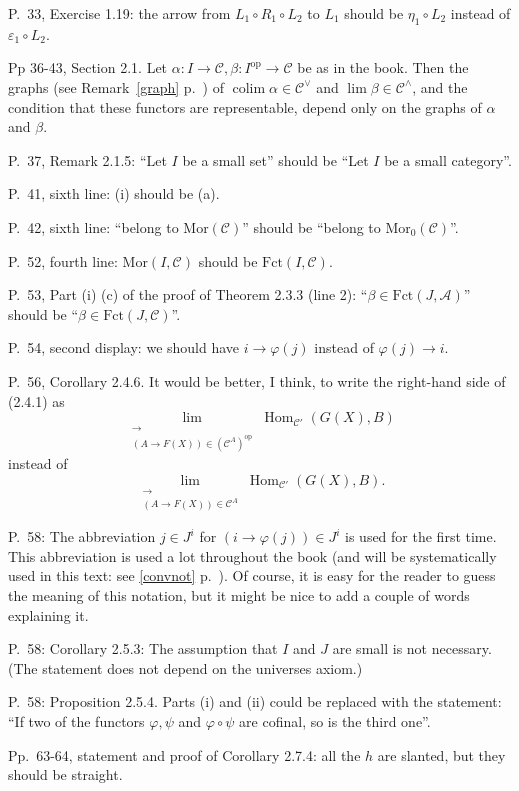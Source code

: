 \documentclass[12pt]{article}
\theoremstyle{remark}%
\newcommand{\n}{\noindent}
\newcommand{\A}{\mathcal A}
\newcommand{\C}{\mathcal C}
\DeclareMathOperator*{\coli}{colim}
\DeclareMathOperator{\h}{Hom}
\DeclareMathOperator{\op}{op}
\begin{document}
\n P.~33, Exercise 1.19: the arrow from $L_1\circ R_1\circ L_2$ to $L_1$ should be $\eta_1\circ L_2$ instead of $\varepsilon_1\circ L_2$. 

\n Pp 36-43, Section 2.1. Let $\alpha:I\to\C,\beta:I^{\op}\to\C$ be as in the book. Then the graphs (see Remark~\ref{graph} p.~\pageref{graph}) of $\coli\alpha\in\C^\vee$ and $\lim\beta\in\C^\wedge$, and the condition that these functors are representable, depend only on the graphs of $\alpha$ and $\beta$. 

\n P.~37, Remark 2.1.5: ``Let $I$ be a small set'' should be ``Let $I$ be a small category''.  

\n P.~41, sixth line: (i) should be (a). 

\n P.~42, sixth line: ``belong to $\text{Mor}(\C)$'' should be ``belong to $\text{Mor}_0(\C)$''.

\n P.~52, fourth line: $\text{Mor}(I,\C)$ should be $\text{Fct}(I,\C)$. 

\n P.~53, Part (i) (c) of the proof of Theorem 2.3.3 (line 2): ``$\beta\in\text{Fct}(J,\A)$'' should be ``$\beta\in\text{Fct}(J,\C)$''.

\n P.~54, second display: we should have $i\to\varphi(j)$ instead of $\varphi(j)\to i$. 

\n P.~56, Corollary 2.4.6. It would be better, I think, to write the right-hand side of (2.4.1) as 
$$
\lim_{\substack{\longrightarrow\\ (A\to F(X))\in(\C^A)^{\op}}}\h_{\C'}(G(X),B)
$$ 
instead of 
$$ 
\lim_{\substack{\longrightarrow\\ (A\to F(X))\in\C^A}}\h_{\C'}(G(X),B). 
$$

\n P.~58: The abbreviation $j\in J^i$ for $(i\to\varphi(j))\in J^i$ is used for the first time. This abbreviation is used a lot throughout the book (and will be systematically used in this text: see \eqref{convnot} p.~\pageref{convnot}). Of course, it is easy for the reader to guess the meaning of this notation, but it might be nice to add a couple of words explaining it. 

\n P.~58: Corollary 2.5.3: The assumption that $I$ and $J$ are small is not necessary. (The statement does not depend on the universes axiom.) 

\n P.~58: Proposition 2.5.4. Parts (i) and (ii) could be replaced with the statement: ``If two of the functors $\varphi,\psi$ and $\varphi\circ\psi$ are cofinal, so is the third one''.

\n Pp.~63-64, statement and proof of Corollary 2.7.4: all the $h$ are slanted, but they should be straight.
\end{document}
